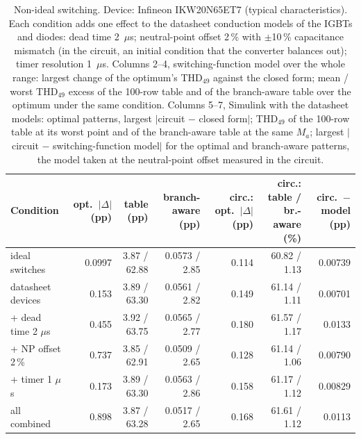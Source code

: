 \begin{table}[!t]
\centering
\caption{Non-ideal switching. Device: Infineon IKW20N65ET7 (typical characteristics). Each condition adds one effect to the datasheet conduction models of the IGBTs and diodes: dead time 2~$\mu$s; neutral-point offset 2\,\% with $\pm$10\,\% capacitance mismatch (in the circuit, an initial condition that the converter balances out); timer resolution 1~$\mu$s. Columns 2--4, switching-function model over the whole range: largest change of the optimum's THD$_{49}$ against the closed form; mean / worst THD$_{49}$ excess of the 100-row table and of the branch-aware table over the optimum under the same condition. Columns 5--7, Simulink with the datasheet models: optimal patterns, largest $|$circuit $-$ closed form$|$; THD$_{49}$ of the 100-row table at its worst point and of the branch-aware table at the same $M_a$; largest $|$circuit $-$ switching-function model$|$ for the optimal and branch-aware patterns, the model taken at the neutral-point offset measured in the circuit.}
\label{tab:nonideal}
\footnotesize
\setlength{\tabcolsep}{4pt}
\begin{tabular}{lrrrrrr}
\toprule
Condition & opt.\ $|\Delta|$ (pp) & table (pp) & branch-aware (pp) & circ.: opt.\ $|\Delta|$ (pp) & circ.: table / br.-aware (\%) & circ.\ $-$ model (pp) \\
\midrule
ideal switches & 0.0997 & 3.87 / 62.88 & 0.0573 / 2.85 & 0.114 & 60.82 / 1.13 & 0.00739 \\
datasheet devices & 0.153 & 3.89 / 63.30 & 0.0561 / 2.82 & 0.149 & 61.14 / 1.11 & 0.00701 \\
+ dead time 2 $\mu$s & 0.455 & 3.92 / 63.75 & 0.0565 / 2.77 & 0.180 & 61.57 / 1.17 & 0.0133 \\
+ NP offset 2\,\% & 0.737 & 3.85 / 62.91 & 0.0509 / 2.65 & 0.128 & 61.14 / 1.06 & 0.00790 \\
+ timer 1 $\mu$s & 0.173 & 3.89 / 63.30 & 0.0563 / 2.86 & 0.158 & 61.17 / 1.12 & 0.00829 \\
all combined & 0.898 & 3.87 / 63.28 & 0.0517 / 2.65 & 0.168 & 61.61 / 1.12 & 0.0113 \\
\bottomrule
\end{tabular}
\end{table}
